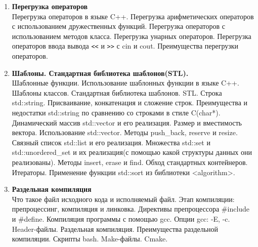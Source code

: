 \documentclass{article}
\begin{document}
\begin{enumerate}
\item \textbf{Перегрузка операторов}\\
Перегрузка операторов в языке C++. Перегрузка арифметических операторов с использованием дружественных функций. Перегрузка операторов с использованием методов класса. Перегрузка унарных операторов. Перегрузка операторов ввода вывода \verb|<<| и \verb|>>| с cin и cout. Преимущества перегрузки операторов.\\

\item \textbf{Шаблоны. Стандартная библиотека шаблонов(STL).}\\
Шаблонные функции. Использование шаблонных функции в языке C++. Шаблоны классов. Стандартная библиотека шаблонов. STL. Строка std::string. Присваивание, конкатенация и сложение строк. Преимущества и недостатки std::string по сравнению со строками в стиле C(char*). Динамический массив std::vector и его реализация. Размер и вместимость вектора. Использование std::vector. Методы push\_back, reserve и resize. Связный список std::list и его реализация. Множества std::set и std::unordered\_set и их реализация(с помощью какой структуры данных они реализованы). Методы insert, erase и find. Обход стандартных контейнеров. Итераторы. Применение функции std::sort из библиотеки <algorithm>.\\

\item \textbf{Раздельная компиляция}\\
Что такое файл исходного кода и исполняемый файл. Этап компиляции: препроцессинг, компиляция и линковка. Директивы препроцессора \#include и \#define. Компиляция программы с помощью gcc. Опции gcc: -E, -c. Header-файлы. Раздельная компиляция. Преимущества раздельной компиляции. Скрипты bash. Make-файлы. Cmake.

\end{enumerate}
\end{document}
